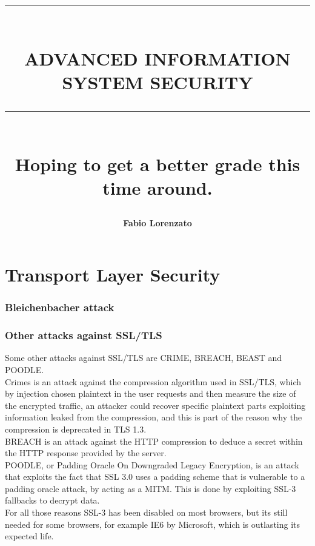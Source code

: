 \documentclass{report}
\newcommand{\HRule}[1]{\rule{\linewidth}{#1}}
\begin{document}

\title{ \normalsize \textsc{}
		\\ [2.0cm]
		\HRule{1.5pt} \\
    \LARGE \textbf{\uppercase{Advanced Information System Security}}
		\HRule{2.0pt} \\ [0.6cm] \LARGE{Hoping to get a better grade this time around.} \vspace*{10\baselineskip}}
\author{\textbf{Fabio Lorenzato}} 
		

\maketitle
\newpage

\tableofcontents
\newpage
\chapter{Transport Layer Security}


\subsection{Bleichenbacher attack}

\subsection{Other attacks against SSL/TLS}
Some other attacks against SSL/TLS are CRIME, BREACH, BEAST and
POODLE.\\
Crimes is an attack against the compression algorithm used in SSL/TLS,
which by injection chosen plaintext in the user requests and then
measure the size of the encrypted traffic, an attacker could recover
specific plaintext parts exploiting information leaked from the
compression, and this is part of the reason why the compression is
deprecated in TLS 1.3.\\
BREACH is an attack against the HTTP compression to deduce a secret
within the HTTP response provided by the server.\\
POODLE, or Padding Oracle On Downgraded Legacy Encryption, is an 
attack that exploits the fact that SSL 3.0 uses a padding scheme that
is vulnerable to a padding oracle attack, by acting as a MITM. This is
done by exploiting SSL-3 fallbacks to decrypt data.\\
For all those reasons SSL-3 has been disabled on most browsers, but
its still needed for some browsers, for example IE6 by Microsoft,
which is outlasting its expected life.
\end{document}
